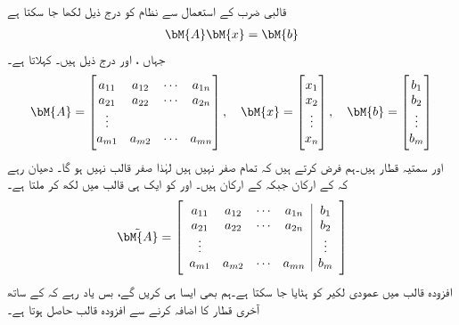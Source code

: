 قالبی ضرب کے استعمال سے نظام  کو درج ذیل لکھا جا سکتا ہے
\begin{align}
\bM{A}\bM{x}=\bM{b}
\end{align}
جہاں ،  اور  درج ذیل ہیں۔  کہلاتا ہے۔
\begin{align}
\bM{A}=\begin{bmatrix} a_{11}&a_{12}&\cdots &a_{1n}\\a_{21}&a_{22}&\cdots&a_{2n}\\\vdots\\a_{m1}&a_{m2}&\cdots&a_{mn} \end{bmatrix}, \quad \bM{x}=\begin{bmatrix}x_1\\x_2\\ \vdots \\x_n  \end{bmatrix}, \quad \bM{b}=\begin{bmatrix} b_1\\b_2\\ \vdots\\ b_m \end{bmatrix}
\end{align}
 اور  سمتیہ قطار ہیں۔ہم فرض کرتے ہیں کہ  تمام صفر نہیں ہیں لہٰذا  صفر قالب نہیں ہو گا۔  دھیان رہے کہ  کے  ارکان جبکہ  کے  ارکان ہیں۔ اور  کو ایک ہی قالب میں لکھ کر    ملتا ہے۔
\begin{align}
\tilde{\bM{A}}=\left[\begin{array}{cccc|c} a_{11}&a_{12}&\cdots &a_{1n}&b_1\\a_{21}&a_{22}&\cdots&a_{2n}&b_2\\ \vdots &&&&\vdots\\a_{m1}&a_{m2}&\cdots&a_{mn}&b_m \end{array}\right]
\end{align}
افزودہ قالب میں عمودی لکیر کو ہٹایا جا سکتا ہے۔ہم بھی ایسا ہی کریں گے، بس یاد رہے کہ   کے ساتھ آخری قطار  کا اضافہ کرنے  سے افزودہ قالب  حاصل ہوتا ہے۔ 


